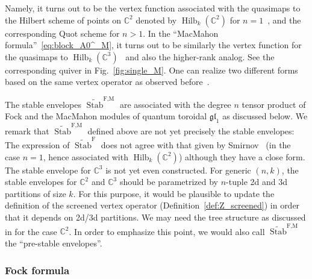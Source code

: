 Namely, it turns out to be the vertex function associated with the quasimaps to the Hilbert scheme of points on $\mathbb{C}^2$ denoted by $\operatorname{Hilb}_k(\mathbb{C}^{2})$ for $n = 1$~\cite{Smirnov:2019rmq}, and the corresponding Quot scheme for $n > 1$.
In the ``MacMahon formula''~\eqref{eq:block_A0^_M}, it turns out to be similarly the vertex function for the quasimaps to $\operatorname{Hilb}_k(\mathbb{C}^{3})$~\cite{Cao:2023lon,Piazzalunga:2023qik} and also the higher-rank analog.
See the corresponding quiver in Fig.~\ref{fig:single_M}.
One can realize two different forms based on the same vertex operator as observed before~\cite{Kimura:2023bxy}.


The stable envelopes $\widetilde{\operatorname{Stab}}^\text{F,M}$ are associated with the degree $n$ tensor product of Fock and the MacMahon modules of quantum toroidal $\mathfrak{gl}_1$ as discussed below.
We remark that $\widetilde{\operatorname{Stab}}^\text{F,M}$ defined above are not yet precisely the stable envelopes:
The expression of $\widetilde{\operatorname{Stab}}^\text{F}$ does not agree with that given by Smirnov~\cite{Smirnov:2018drm} (in the case $n = 1$, hence associated with $\operatorname{Hilb}_k(\mathbb{C}^{2})$) although they have a close form.
The stable envelope for $\mathbb{C}^{3}$ is not yet even constructed.
For generic $(n,k)$, the stable envelopes for $\mathbb{C}^2$ and $\mathbb{C}^3$ should be parametrized by $n$-tuple 2d and 3d partitions of size $k$.
For this purpose, it would be plausible to update the definition of the screened vertex operator (Definition~\ref{def:Z_screened}) in order that it depends on 2d/3d partitions.
We may need the tree structure as discussed in \cite{Smirnov:2018drm} for the case $\mathbb{C}^2$.
In order to emphasize this point, we would also call $\widetilde{\operatorname{Stab}}^\text{F,M}$ the ``pre-stable envelopes''.


\subsubsection{Fock formula}

